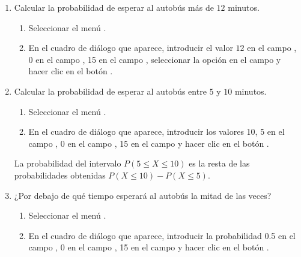 \begin{enumerate}[leftmargin=*]
\begin{enumerate}
\item Calcular la probabilidad de esperar al autobús más de $12$ minutos.
\begin{indicacion}{
\begin{enumerate}
\item Seleccionar el menú .
\item En el cuadro de diálogo que aparece, introducir el valor $12$ en el campo , 0 en el
campo , 15 en el campo , seleccionar la opción  en el campo  y hacer clic en el
botón .
\end{enumerate}}
\end{indicacion}

\item Calcular la probabilidad de esperar al autobús entre $5$ y $10$ minutos.
\begin{indicacion}{
\begin{enumerate}
\item Seleccionar el menú .
\item En el cuadro de diálogo que aparece, introducir los valores 10, 5 en el campo , 0 en el campo
, 15 en el campo  y hacer clic en el botón .
\end{enumerate}
La probabilidad del intervalo $P(5\leq X\leq 10)$ es la resta de las probabilidades obtenidas $P(X\leq 10)-P(X\leq 5)$.
}
\end{indicacion}

\item ¿Por debajo de qué tiempo esperará al autobús la mitad de las veces?
\begin{indicacion}{
\begin{enumerate}
\item Seleccionar el menú .
\item En el cuadro de diálogo que aparece, introducir la probabilidad 0.5 en el campo ,
0 en el campo , 15 en el campo  y hacer clic en el botón .
\end{enumerate}}
\end{indicacion}


\end{enumerate}
\end{enumerate}
